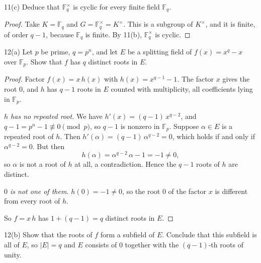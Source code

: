 \documentclass[11pt]{article}
\begin{document}
\begin{problem}{11(c)}
  Deduce that $\mathbb{F}_q^\times$ is cyclic for every finite field
  $\mathbb{F}_q$.
\end{problem}

\begin{proof}
Take $K = \mathbb{F}_q$ and $G = \mathbb{F}_q^\times = K^\times$. This is a
subgroup of $K^\times$, and it is finite, of order $q - 1$, because
$\mathbb{F}_q$ is finite. By 11(b), $\mathbb{F}_q^\times$ is cyclic.
\end{proof}

\begin{problem}{12(a)}
  Let $p$ be prime, $q = p^n$, and let $E$ be a splitting field of
  $f(x) = x^q - x$ over $\mathbb{F}_p$. Show that $f$ has $q$ distinct roots
  in $E$.
\end{problem}

\begin{proof}
Factor $f(x) = x\,h(x)$ with $h(x) = x^{q-1} - 1$. The factor $x$ gives the root
$0$, and $h$ has $q - 1$ roots in $E$ counted with multiplicity, all
coefficients lying in $\mathbb{F}_p$.

\emph{$h$ has no repeated root.} We have $h'(x) = (q-1)\,x^{q-2}$, and
$q - 1 = p^n - 1 \not\equiv 0 \pmod p$, so $q - 1$ is nonzero in
$\mathbb{F}_p$. Suppose $\alpha \in E$ is a repeated root of $h$. Then
$h'(\alpha) = (q-1)\,\alpha^{q-2} = 0$, which holds if and only if
$\alpha^{q-2} = 0$. But then
\[
  h(\alpha) = \alpha^{q-2}\,\alpha - 1 = -1 \neq 0,
\]
so $\alpha$ is not a root of $h$ at all, a contradiction. Hence the $q - 1$
roots of $h$ are distinct.

\emph{$0$ is not one of them.} $h(0) = -1 \neq 0$, so the root $0$ of the
factor $x$ is different from every root of $h$.

So $f = x\,h$ has $1 + (q - 1) = q$ distinct roots in $E$.
\end{proof}

\begin{problem}{12(b)}
  Show that the roots of $f$ form a subfield of $E$. Conclude that this
  subfield is all of $E$, so $|E| = q$ and $E$ consists of $0$ together with
  the $(q-1)$-th roots of unity.
\end{problem}
\end{document}
